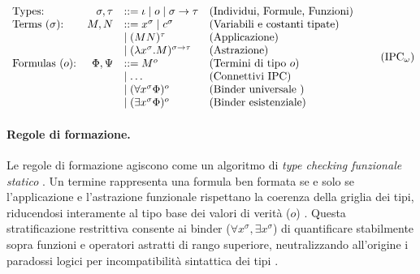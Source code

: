 \begin{equation}
    \begin{array}{lrll}
        \text{Types:}            & \sigma, \tau & ::= \iota \mid o \mid \sigma \to \tau        & \text{(Individui, Formule, Funzioni)}  \\
        \text{Terms ($\sigma$):} & M, N         & ::= x^\sigma \mid c^\sigma    \quad          & \text{(Variabili e costanti tipate)}   \\
                                 &              & \mid (M N)^\tau                              & \text{(Applicazione)}                  \\
                                 &              & \mid (\lambda x^\sigma. M)^{\sigma \to \tau} & \text{(Astrazione)}                    \\
        \text{Formulas ($o$):}   & \Phi, \Psi   & ::= M^o                        \quad         & \text{(Termini di tipo } o \text{)}    \\
                                 &              & \mid \dots                     \quad         & \text{(Connettivi IPC)}                \\
                                 &              & \mid (\forall x^\sigma \Phi)^o \quad         & \text{(Binder universale )}            \\
                                 &              & \mid (\exists x^\sigma \Phi)^o \quad         & \text{(Binder esistenziale)}
    \end{array}
    \tag{$\text{IPC}_\omega$}
    \label{eq:ipcw_grammar}
\end{equation}

\paragraph{Regole di formazione.}
Le regole di formazione agiscono come un algoritmo di \emph{type checking funzionale statico} \cite{hindley1997}. Un termine rappresenta una formula ben formata 
se e solo se l'applicazione e l'astrazione funzionale rispettano la coerenza della griglia dei tipi, riducendosi interamente al tipo base dei valori di verità 
($o$) \cite{hindley1997}. Questa stratificazione restrittiva consente ai binder ($\forall x^\sigma, \exists x^\sigma$) di quantificare stabilmente sopra funzioni 
e operatori astratti di rango superiore, neutralizzando all'origine i paradossi logici per incompatibilità sintattica dei tipi \cite{hindley1997}.

